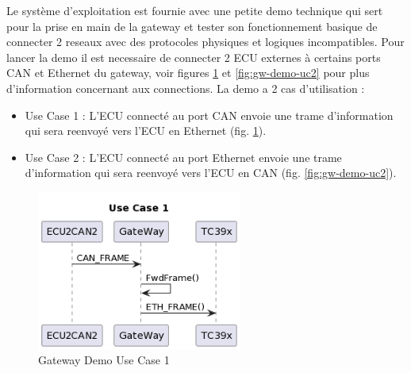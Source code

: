 Le syst\`eme d'exploitation est fournie avec une petite demo technique qui sert pour la prise en main de la gateway et tester son fonctionnement basique de connecter 2 reseaux avec des protocoles physiques et logiques incompatibles. Pour lancer la demo il est necessaire de connecter 2 ECU externes \`a certains ports CAN et Ethernet du gateway, voir figures \ref{fig:gw-demo-uc1} et \ref{fig:gw-demo-uc2} pour plus d'information concernant aux connections. La demo a 2 cas d'utilisation :


\begin{itemize}
    \item Use Case 1 : L'ECU connect\'e au port CAN envoie une trame d'information qui sera reenvoy\'e vers l'ECU en Ethernet (fig. \ref{fig:gw-demo-uc1}).%
    \item Use Case 2 : L'ECU connect\'e au port Ethernet envoie une trame d'information qui sera reenvoy\'e vers l'ECU en CAN (fig. \ref{fig:gw-demo-uc2}).%
\end{itemize}

\begin{figure}[!htb]
 \centering
 \includegraphics[width=0.6\textwidth]{img/GWUseCase1.png}
 \caption{Gateway Demo Use Case 1}
 \label{fig:gw-demo-uc1}
\end{figure}

